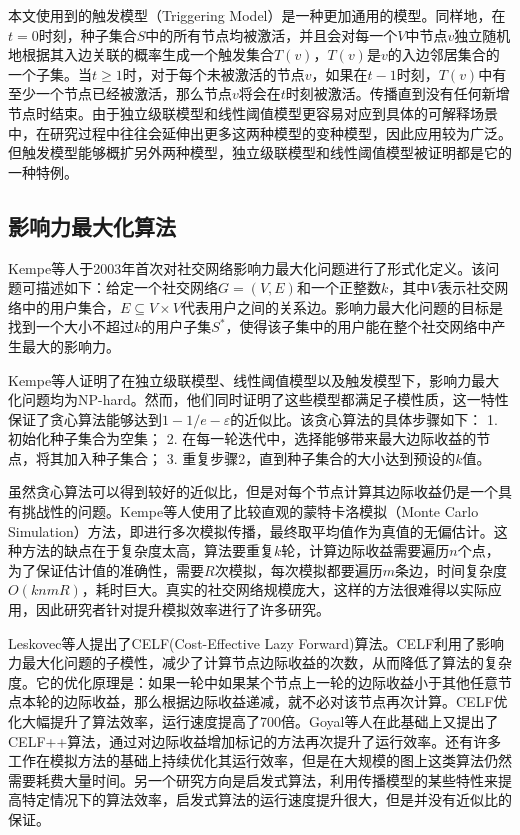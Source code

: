 本文使用到的触发模型（Triggering Model）是一种更加通用的模型。同样地，在$t=0$时刻，种子集合$S$中的所有节点均被激活，并且会对每一个$V$中节点$v$独立随机地根据其入边关联的概率生成一个触发集合$T(v)$，$T(v)$是$v$的入边邻居集合的一个子集。当$t\ge 1$时，对于每个未被激活的节点$v$，如果在$t-1$时刻，$T(v)$中有至少一个节点已经被激活，那么节点$v$将会在$t$时刻被激活。传播直到没有任何新增节点时结束。由于独立级联模型和线性阈值模型更容易对应到具体的可解释场景中，在研究过程中往往会延伸出更多这两种模型的变种模型，因此应用较为广泛。但触发模型能够概扩另外两种模型，独立级联模型和线性阈值模型被证明都是它的一种特例\cite{kempe2003maximizing}。


\subsection{影响力最大化算法}

Kempe等人\cite{kempe2003maximizing}于2003年首次对社交网络影响力最大化问题进行了形式化定义。该问题可描述如下：给定一个社交网络$G=(V,E)$和一个正整数$k$，其中$V$表示社交网络中的用户集合，$E \subseteq V \times V$代表用户之间的关系边。影响力最大化问题的目标是找到一个大小不超过$k$的用户子集$S^*$，使得该子集中的用户能在整个社交网络中产生最大的影响力。

Kempe等人证明了在独立级联模型、线性阈值模型以及触发模型下，影响力最大化问题均为NP-hard。然而，他们同时证明了这些模型都满足子模性质，这一特性保证了贪心算法能够达到$1-1/e-\varepsilon$的近似比。该贪心算法的具体步骤如下：
1. 初始化种子集合为空集；
2. 在每一轮迭代中，选择能够带来最大边际收益的节点，将其加入种子集合；
3. 重复步骤2，直到种子集合的大小达到预设的$k$值。

虽然贪心算法可以得到较好的近似比，但是对每个节点计算其边际收益仍是一个具有挑战性的问题。Kempe等人使用了比较直观的蒙特卡洛模拟（Monte Carlo Simulation）方法，即进行多次模拟传播，最终取平均值作为真值的无偏估计。这种方法的缺点在于复杂度太高，算法要重复$k$轮，计算边际收益需要遍历$n$个点，为了保证估计值的准确性，需要$R$次模拟，每次模拟都要遍历$m$条边，时间复杂度$O(knmR)$，耗时巨大。真实的社交网络规模庞大，这样的方法很难得以实际应用，因此研究者针对提升模拟效率进行了许多研究。

Leskovec等人提出了CELF(Cost-Effective Lazy Forward)算法\cite{leskovec2007cost}。CELF利用了影响力最大化问题的子模性，减少了计算节点边际收益的次数，从而降低了算法的复杂度。它的优化原理是：如果一轮中如果某个节点上一轮的边际收益小于其他任意节点本轮的边际收益，那么根据边际收益递减，就不必对该节点再次计算。CELF优化大幅提升了算法效率，运行速度提高了700倍。Goyal等人\cite{goyal2011celf++}在此基础上又提出了CELF++算法，通过对边际收益增加标记的方法再次提升了运行效率。还有许多工作在模拟方法的基础上持续优化其运行效率\cite{kumar2022csr,王璿2022基于社交网络的影响力最大化算法}，但是在大规模的图上这类算法仍然需要耗费大量时间。另一个研究方向是启发式算法，利用传播模型的某些特性来提高特定情况下的算法效率\cite{kumar2022mder,lozano2024efficient,chen2009efficient,chen2010scalable,chen2010scalable2,goyal2011simpath}，启发式算法的运行速度提升很大，但是并没有近似比的保证。

